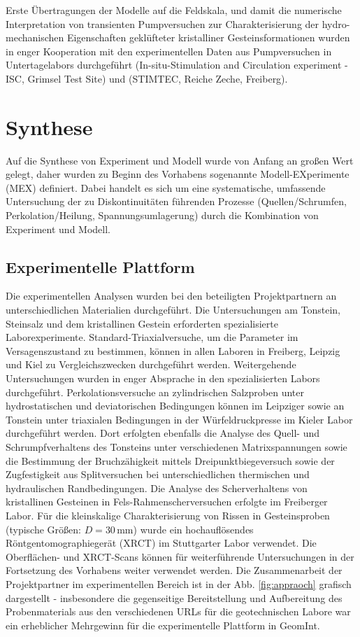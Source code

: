 Erste Übertragungen der Modelle auf die Feldskala, und damit die numerische Interpretation von transienten Pumpversuchen zur Charakterisierung der hydro-mechanischen Eigenschaften geklüfteter kristalliner Gesteinsformationen wurden in enger Kooperation mit den experimentellen Daten aus Pumpversuchen 
in Untertagelabors durchgeführt \cite{steeb-2020b} (In-situ-Stimulation and Circulation experiment - ISC, Grimsel Test Site) und \cite{steeb-2020c} (STIMTEC, Reiche Zeche, Freiberg).

\section*{Synthese}
\label{sec:syn}

Auf die Synthese von Experiment und Modell wurde von Anfang an gro{\ss}en Wert gelegt, daher wurden zu Beginn des Vorhabens sogenannte Modell-EXperimente (MEX) definiert.
Dabei handelt es sich um eine systematische, umfassende Untersuchung der zu Diskontinuitäten führenden Prozesse (Quellen/Schrumfen, Perkolation/Heilung, Spannungsumlagerung) durch die Kombination von Experiment und Modell.

\subsection*{Experimentelle Plattform}
\label{sec:exp}

Die experimentellen Analysen wurden bei den beteiligten Projektpartnern an unterschiedlichen Materialien durchgeführt. Die Untersuchungen am Tonstein, Steinsalz und dem kristallinen Gestein erforderten spezialisierte Laborexperimente. Standard-Triaxialversuche, um die Parameter im Versagenszustand zu bestimmen, können in allen Laboren in Freiberg, Leipzig und Kiel zu Vergleichszwecken durchgeführt werden.
Weitergehende Untersuchungen wurden in enger Absprache in den spezialisierten Labors durchgeführt.
%
Perkolationsversuche an zylindrischen Salzproben unter hydrostatischen und deviatorischen Bedingungen können im Leipziger sowie an Tonstein unter triaxialen Bedingungen in der Würfeldruckpresse im Kieler Labor durchgeführt werden. Dort erfolgten ebenfalls die Analyse des Quell- und Schrumpfverhaltens des Tonsteins unter verschiedenen Matrixspannungen sowie die Bestimmung der Bruchzähigkeit mittels Dreipunktbiegeversuch sowie der Zugfestigkeit aus Splitversuchen bei unterschiedlichen thermischen und hydraulischen Randbedingungen.
%
Die Analyse des Scherverhaltens von kristallinen Gesteinen in Fels-Rahmenscherversuchen erfolgte im Freiberger Labor. Für die kleinskalige Charakterisierung von Rissen in Gesteinsproben (typische Grö{\ss}en: $D=30$\,mm) wurde ein hochauflösendes Röntgentomographiegerät (XRCT) im Stuttgarter Labor verwendet. 
Die Oberflächen- und XRCT-Scans können für weiterführende  Untersuchungen in der Fortsetzung des Vorhabens weiter verwendet werden.
%
Die Zusammenarbeit der Projektpartner im experimentellen Bereich ist in der Abb. \ref{fig:appraoch} grafisch dargestellt - insbesondere die gegenseitige Bereitstellung und Aufbereitung des Probenmaterials aus den verschiedenen URLs für die geotechnischen Labore war ein erheblicher Mehrgewinn für die experimentelle Plattform in GeomInt.

